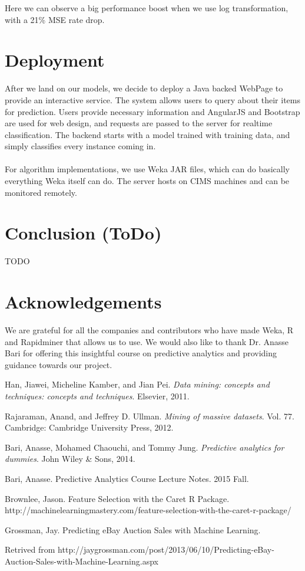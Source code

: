 \documentclass[CEJM,PDF]{cej} %
\begin{document}
Here we can observe a big performance boost when we use log transformation, with a 21\% MSE rate drop.

\section{Deployment}
After we land on our models, we decide to deploy a Java backed WebPage to provide an interactive service. The system allows users to query about their items for prediction. Users provide necessary information and AngularJS and Bootstrap are used for web design, and requests are passed to the server for realtime classification. The backend starts with a model trained with training data, and simply classifies every instance coming in.\\
\\
For algorithm implementations, we use Weka JAR files, which can do basically everything Weka itself can do. The server hosts on CIMS machines and can be monitored remotely.

\section{Conclusion (ToDo)}
TODO


\section*{Acknowledgements}

We are grateful for all the companies and contributors who have made Weka, R and Rapidminer that allows us to use. We would also like to thank Dr. Anasse Bari for offering this insightful course on predictive analytics and providing guidance towards our project.


\begin{thebibliography}{9}

Han, Jiawei, Micheline Kamber, and Jian Pei.\textit{ Data mining: concepts and techniques: concepts and techniques}. Elsevier, 2011.

 Rajaraman, Anand, and Jeffrey D. Ullman. \textit{Mining of massive datasets}. Vol. 77. Cambridge: Cambridge University Press, 2012.

 Bari, Anasse, Mohamed Chaouchi, and Tommy Jung. \textit{Predictive analytics for dummies}. John Wiley \& Sons, 2014.	

 Bari, Anasse. Predictive Analytics Course Lecture Notes. 2015 Fall.

  Brownlee, Jason. Feature Selection with the Caret R Package. http://machinelearningmastery.com/feature-selection-with-the-caret-r-package/

 Grossman, Jay. Predicting eBay Auction Sales with Machine Learning.

Retrived from http://jaygrossman.com/post/2013/06/10/Predicting-eBay-Auction-Sales-with-Machine-Learning.aspx


\end{thebibliography}
\end{document}
